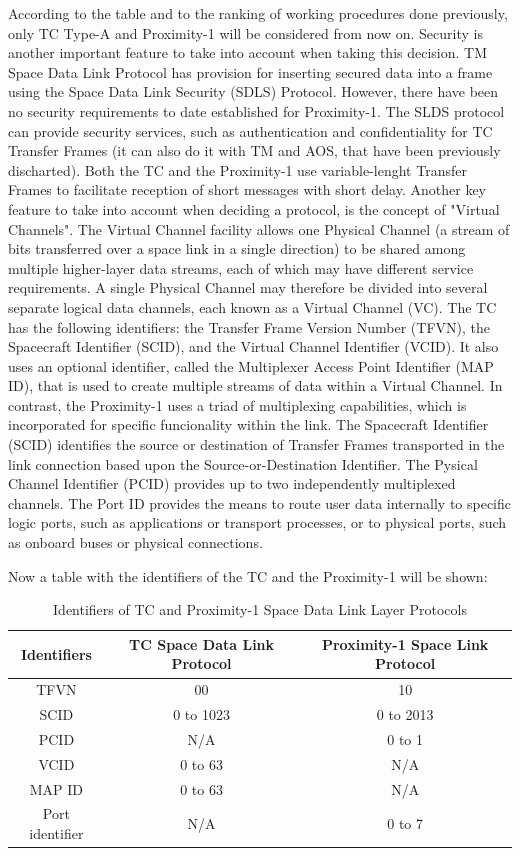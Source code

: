 According to the table and to the ranking of working procedures done previously, only TC Type-A and Proximity-1 will be considered from now on. Security is another important feature to take into account when taking this decision. TM Space Data Link Protocol has provision for inserting secured data into a frame using the Space Data Link Security (SDLS) Protocol. However, there have been no security requirements to date established for Proximity-1. The SLDS protocol can provide security services, such as authentication and confidentiality for TC Transfer Frames (it can also do it with TM and AOS, that have been previously discharted). Both the TC and the Proximity-1 use variable-lenght Transfer Frames to facilitate reception of short messages with short delay. Another key feature to take into account when deciding a protocol, is the concept of "Virtual Channels". The Virtual Channel facility allows one Physical Channel (a stream of bits transferred over a space link in a single direction) to be shared among multiple higher-layer data streams, each of which may have different service requirements. A single Physical Channel may therefore be divided into several separate logical data channels, each known as a Virtual Channel (VC). The TC has the following identifiers: the Transfer Frame Version Number (TFVN), the Spacecraft Identifier (SCID), and the Virtual Channel Identifier (VCID). It also uses an optional identifier, called the Multiplexer Access Point Identifier (MAP ID), that is used to create multiple streams of data within a Virtual Channel. In contrast, the Proximity-1 uses a triad of multiplexing capabilities, which is incorporated for specific funcionality within the link. The Spacecraft Identifier (SCID) identifies the source or destination of Transfer Frames transported in the link connection based upon the Source-or-Destination Identifier. The Pysical Channel Identifier (PCID) provides up to two independently multiplexed channels. The Port ID provides the means to route user data internally to specific logic ports, such as applications or transport processes, or to physical ports, such as onboard buses or physical connections.

Now a table with the identifiers of the TC and the Proximity-1 will be shown:

\begin{table}[H]
\begin{center}
\begin{tabular}{|c|c|c|}
\hline
Identifiers&TC Space Data Link Protocol&Proximity-1 Space Link Protocol\\
\hline
TFVN&00&10\\
\hline
SCID&0 to 1023&0 to 2013\\
\hline
PCID&N/A&0 to 1\\
\hline
VCID&0 to 63&N/A\\
\hline
MAP ID&0 to 63&N/A\\
\hline
Port identifier&N/A&0 to 7\\
\hline
\end{tabular}
\caption{Identifiers of TC and Proximity-1 Space Data Link Layer Protocols}
\end{center}
\end{table}

